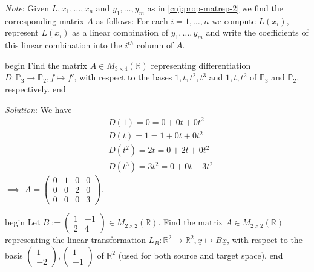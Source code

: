\documentclass[
  12pt,
  a4paper,
  twoside]{article}
\theoremstyle{plain}
\theoremstyle{definition}
\begin{document}
\emph{Note}: Given \(L, x_{1}, \dots, x_{n}\) and \(y_{1}, \dots, y_{m}\) as in \ref{cnj:prop-matrep-2} we find the corresponding matrix \(A\) as follows: For each \(i = 1, \dots, n\) we compute \(L(x_{i})\), represent \(L(x_{i})\) as a linear combination of \(y_{1}, \dots, y_{m}\) and write the coefficients of this linear combination into the \(i^{th}\) column of \(A\).

\csname begin\label{cnj:expl-matrep-diff}
Find the matrix \(A \in M_{3 \times 4}(\mathbb{R})\) representing differentiation \(D: \mathbb{P}_{3} \to \mathbb{P}_{2}, f \mapsto f'\), with respect to the bases \(1,t,t^{2},t^{3}\) and \(1,t,t^{2}\) of \(\mathbb{P}_{3}\) and \(\mathbb{P}_{2}\), respectively.
\csname end

\emph{Solution}: We have
\begin{align*} & D(1) = 0 = 0 + 0t + 0t^{2}
\\ & D(t) = 1 = 1 + 0t + 0t^{2}
\\ & D(t^{2}) = 2t = 0 + 2t + 0t^{2}
\\ & D(t^{3}) = 3t^{2} = 0 + 0t + 3t^{2}
\end{align*}
\(\implies\) \(A = \begin{pmatrix} 0 & 1 & 0 & 0 \\ 0 & 0 & 2 & 0 \\ 0 & 0 & 0 & 3 \end{pmatrix}\).

\csname begin\label{cnj:expl-matrep-matx}
Let \(B := \begin{pmatrix} 1 & -1 \\ 2 & 4 \end{pmatrix} \in M_{2 \times 2}(\mathbb{R})\). Find the matrix \(A \in M_{2 \times 2}(\mathbb{R})\) representing the linear transformation \(L_{B}: \mathbb{R}^{2} \to \mathbb{R}^{2}, \underline{x} \mapsto B \underline{x}\), with respect to the basis \(\begin{pmatrix} 1 \\ -2 \end{pmatrix}, \begin{pmatrix} 1 \\ -1 \end{pmatrix}\) of \(\mathbb{R}^{2}\) (used for both source and target space).
\csname end
\end{document}
